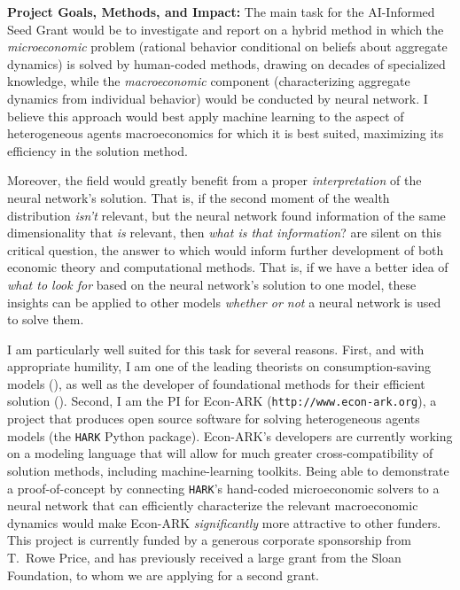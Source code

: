 \documentclass[11pt,pdftex,letterpaper]{article}
\begin{document}
\vspace{0.25cm}

\noindent \textbf{Project Goals, Methods, and Impact:} The main task for the AI-Informed Seed Grant would be to investigate and report on a hybrid method in which the \textit{microeconomic} problem (rational behavior conditional on beliefs about aggregate dynamics) is solved by human-coded methods, drawing on decades of specialized knowledge, while the \textit{macroeconomic} component (characterizing aggregate dynamics from individual behavior) would be conducted by neural network. I believe this approach would best apply machine learning to the aspect of heterogeneous agents macroeconomics for which it is best suited, maximizing its efficiency in the solution method.

Moreover, the field would greatly benefit from a proper \textit{interpretation} of the neural network's solution. That is, if the second moment of the wealth distribution \textit{isn't} relevant, but the neural network found information of the same dimensionality that \textit{is} relevant, then \textit{what is that information}? \cite{MALIAR202176} are silent on this critical question, the answer to which would inform further development of both economic theory and computational methods. That is, if we have a better idea of \textit{what to look for} based on the neural network's solution to one model, these insights can be applied to other models \textit{whether or not} a neural network is used to solve them.

I am particularly well suited for this task for several reasons. First, and with appropriate humility, I am one of the leading theorists on consumption-saving models (\cite{CarrollBuffer}), as well as the developer of foundational methods for their efficient solution (\cite{CarrollEGM}). Second, I am the PI for Econ-ARK (\texttt{http://www.econ-ark.org}), a project that produces open source software for solving heterogeneous agents models (the \texttt{HARK} Python package). Econ-ARK's developers are currently working on a modeling language that will allow for much greater cross-compatibility of solution methods, including machine-learning toolkits. Being able to demonstrate a proof-of-concept by connecting \texttt{HARK}'s hand-coded microeconomic solvers to a neural network that can efficiently characterize the relevant macroeconomic dynamics would make Econ-ARK \textit{significantly} more attractive to other funders. This project is currently funded by a generous corporate sponsorship from T.\ Rowe Price, and has previously received a large grant from the Sloan Foundation, to whom we are applying for a second grant.
\end{document}
